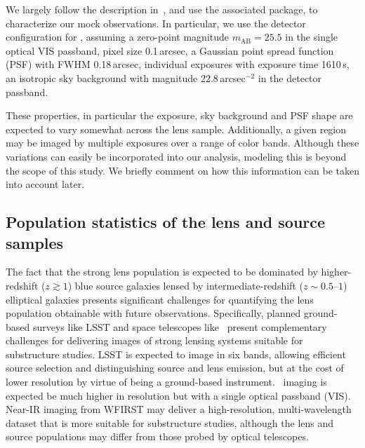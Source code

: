 \documentclass[twocolumn]{aastex62}
\begin{document}
We largely follow the description in~\citet{2015ApJ...811...20C}, and use the associated  package, to characterize our mock observations. In particular, we use the detector configuration for \Euclid, assuming a zero-point magnitude $m_\mathrm{AB} = 25.5$ in the single optical VIS passband, pixel size 0.1\,arcsec, a Gaussian point spread function (PSF) with FWHM 0.18\,arcsec, individual exposures with exposure time 1610\,s, an isotropic sky background with magnitude 22.8\,arcsec$^{-2}$ in the detector passband.

These properties, in particular the exposure, sky background and PSF shape are expected to vary somewhat across the lens sample. Additionally, a given region may be imaged by multiple exposures over a range of color bands. Although these variations can easily be incorporated into our analysis, modeling this is beyond the scope of this study. We briefly comment on how this information can be taken into account later.

\subsection{Population statistics of the lens and source samples}
\label{sec:populations}

The fact that the strong lens population is expected to be dominated by higher-redshift ($z\gtrsim1$) blue source galaxies lensed by intermediate-redshift ($z\sim 0.5$--$1$) elliptical galaxies presents significant challenges for quantifying the lens population obtainable with future observations. Specifically, planned ground-based surveys like LSST and space telescopes like \Euclid~present complementary challenges for delivering images of strong lensing systems suitable for substructure studies. LSST is expected to image in six bands, allowing efficient source selection and distinguishing source and lens emission, but at the cost of lower resolution by virtue of being a ground-based instrument. \Euclid~imaging is expected be much higher in resolution but with a single optical passband (VIS). Near-IR imaging from WFIRST may deliver a high-resolution, multi-wavelength dataset that is more suitable for substructure studies, although the lens and source populations may differ from those probed by optical telescopes.

\end{document}
